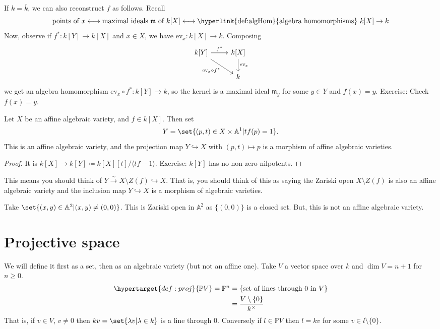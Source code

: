 \documentclass{article}
\newcommand{\A}{\mathbb{A}}
\begin{document}

If $k = \overline{k}$, we can also reconstruct $f$ as follows.
Recall
\begin{equation*}\text{points of }x \longleftrightarrow \text{maximal ideals }\mathfrak{m} \text{ of } k[X] \longleftrightarrow \text{\hyperlink{def:algHom}{algebra homomorphisms} }k[X] \to k\end{equation*}
Now, observe if $f^* : k[Y] \to k[X]$ and $x \in X$, we have $\text{ev}_x: k[X] \to k$.
Composing
\begin{equation*}
    \begin{tikzcd}
        k[Y] \rar["f^*"] \drar["\text{ev}_x \circ f^*"'] & k[X] \dar["\text{ev}_x"] \\ & k
    \end{tikzcd}
\end{equation*}
we get an algebra homomorphism $\text{ev}_x \circ f^* : k[Y] \to k$, so the kernel is a maximal ideal $\mathfrak{m}_y$ for some $y \in Y$ and $f(x) = y$.
Exercise: Check $f(x) = y$.

\begin{prop}
    Let $X$ be an affine algebraic variety, and $f \in k[X]$.  Then set \begin{equation*}Y = \set{(p, t) \in X \times \A^1 | t f(p) = 1}.\end{equation*}
    This is an affine algebraic variety, and the projection map $Y \hookrightarrow X$ with $(p, t) \mapsto p$ is a morphism of affine algebraic varieties.
\end{prop}
\begin{proof}
    It is $k[X] \to k[Y] \coloneqq k[X][t]/\langle tf-1 \rangle$. Exercise: $k[Y]$ has no non-zero nilpotents.
\end{proof}
This means you should think of $Y \xrightarrow{\sim} X \setminus Z(f) \hookrightarrow X$.
That is, you should think of this as saying the Zariski open $X \setminus Z(f)$ is also an affine algebraic variety and the inclusion map $Y \hookrightarrow X$ is a morphism of algebraic varieties.

\begin{warning}
    Take $\set{(x, y) \in \A^2 | (x, y) \neq (0, 0)}$. This is Zariski open in $\A^2$ as $\{(0, 0)\}$ is a closed set. But, this is not an affine algebraic variety.
\end{warning}

\clearpage
\section{Projective space}
We will define it first as a set, then as an algebraic variety (but not an affine one).
Take $V$ a vector space over $k$ and $\dim V = n+1$ for $n \geq 0$.
\begin{align*}
    \hypertarget{def:proj}{\mathbb{P}V} = \mathbb{P}^n &= \{\text{set of lines through } 0 \text{ in } V\} \\
                                                       &= \frac{V \setminus \{0\}}{k^\times}
\end{align*}
That is, if $v \in V$, $v \neq 0$ then $k v = \set{\lambda v | \lambda \in k}$ is a line through $0$.
Conversely if $l \in \mathbb{P}V$ then $l = kv$ for some $v \in l \setminus \{0\}$.
\end{document}
